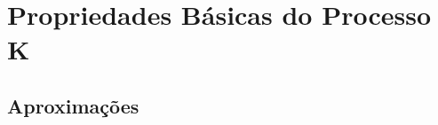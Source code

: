 \chapter{Propriedades Básicas do Processo K}
\label{cap:propriedades}


\section{Aproximações}
\label{sec:aproximacoes}


